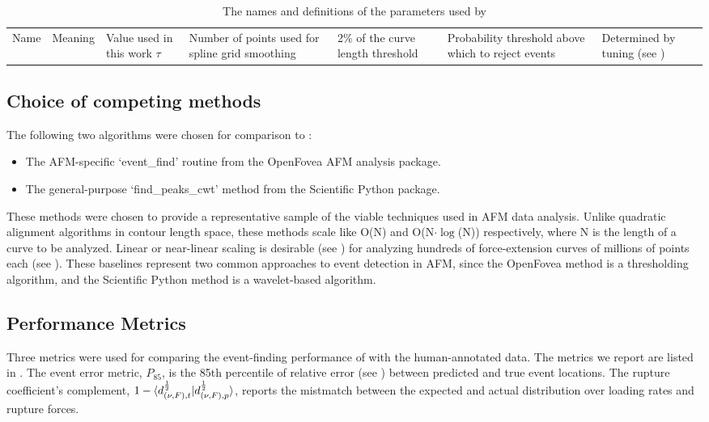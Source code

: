 \begin{table}
\caption[Algorithm parameters]{ The names and definitions of the parameters used by \name{}}
\begin{tabularx}{\textwidth}{ l | l | l | l  }
\hline \hline
Name & Meaning  & Value used in this work \e
$\tau$ & Number of points used for spline grid smoothing & 2\% of the curve length \e
threshold & Probability threshold above which to reject events  & Determined by tuning (see ) \e
\end{tabularx}
\end{table}


\subsection{Choice of competing methods}

The following two algorithms were chosen for comparison to \name{}: 

\begin{itemize}
\item The AFM-specific `event\_find' routine from the OpenFovea AFM analysis package.
\item The general-purpose `find\_peaks\_cwt' method from the Scientific Python package.
\end{itemize}

 These methods were chosen to provide a representative sample of the viable techniques used in AFM data analysis. Unlike quadratic alignment algorithms in contour length space, these methods scale like O(N) and O(N$\cdot\log$(N)) respectively, where N is the length of a curve to be analyzed. Linear or near-linear scaling is desirable (see ) for analyzing hundreds of force-extension curves of millions of points each (see ). These baselines represent two common approaches to event detection in AFM, since the OpenFovea method is a thresholding algorithm, and the Scientific Python method is a wavelet-based algorithm. 

\subsection{Performance Metrics}

Three metrics were used for comparing the event-finding performance of \name{} with the human-annotated data. The metrics we report are listed in . The event error metric, $P_{85}$, is the 85th percentile of relative error (see ) between predicted and true event locations.  The rupture \bc{} coefficient's complement, $1-\braket{d_{(\nu,F),t}^{\frac{1}{2}}|d_{(\nu,F),p}^{\frac{1}{2}}}$, reports the mistmatch between the expected and actual distribution over loading rates and rupture forces. 


